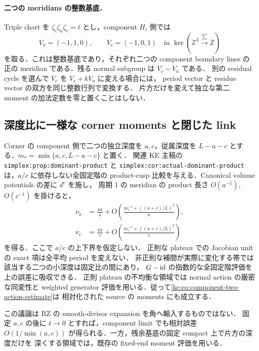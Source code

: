 \paragraph{二つの meridians の整数基底．}
Triple chart を $\zeta_i\zeta_a\zeta_c=t$ とし，component $H_i$ 側では
\[
 V_a=(-1,1,0),\qquad V_c=(-1,0,1)
 \quad\text{in }\ker(\mathbb Z^3\xrightarrow{\sum}\mathbb Z)
\]
を取る．これは整数基底であり，それぞれ二つの component boundary lines の正の
meridian である．残る normal subgroup は $V_c-V_a$ である．
別の residual cycle を選んで $V_c$ を $V_c+kV_a$ に変える場合には，
period vector と residue vector の双方を同じ整数行列で変換する．
片方だけを変えて独立な第二 moment の加法定数を零と置くことはしない．

\subsection{深度比に一様な corner moments と閉じた link}

Corner の component 側で二つの独立深度を $a,c$，従属深度を
$L-a-c$ とする．$m_*=\min\{a,c,L-a-c\}$ と置く．
関連 KE 主稿の \texttt{simplex:prop:dominant-product} と
\texttt{simplex:cor:actual-dominant-product} は，$a/c$ に依存しない全固定階の
product-cusp 比較を与える．Canonical volume potentials の差に $d^c$ を施し，
周期 $1$ の meridian の product 長さ $O(a^{-1})$, $O(c^{-1})$ を掛けると，
\begin{equation}\label{ke:eq:component-two-action-estimate}
 \begin{split}
 \nu_a&=\frac{4\pi}{a}
   +O\!\left(\frac{m_*^{-1}+((a+c)/L)^2}{a}\right),\\
 \nu_c&=\frac{4\pi}{c}
   +O\!\left(\frac{m_*^{-1}+((a+c)/L)^2}{c}\right)
 \end{split}
\end{equation}
を得る．ここで $a/c$ の上下界を仮定しない．
正則な plateau での Jacobian unit の exact 項は全平均 period を変えない．
非正則な補間が実際に変化する帯では該当する二つの小深度は固定比の間にあり，
$G-\operatorname{id}$ の指数的な全固定階評価を上の誤差に吸収できる．
正則 plateau の不均衡な領域では normal action の厳密な同変性と
weighted generator 評価を用いる．従って\eqref{ke:eq:component-two-action-estimate}は
相対化された source の moments にも成立する．

この議論は RZ の smooth-divisor expansion を角へ輸入するものではない．
固定 $a,c$ の後に $t\to0$ とすれば，component limit でも相対誤差
$O(1/\min(a,c))$ が得られる．一方，残余基底の固定 compact 上で片方の深度だけを
深くする領域では，既存の fixed-end moment 評価を用いる．


